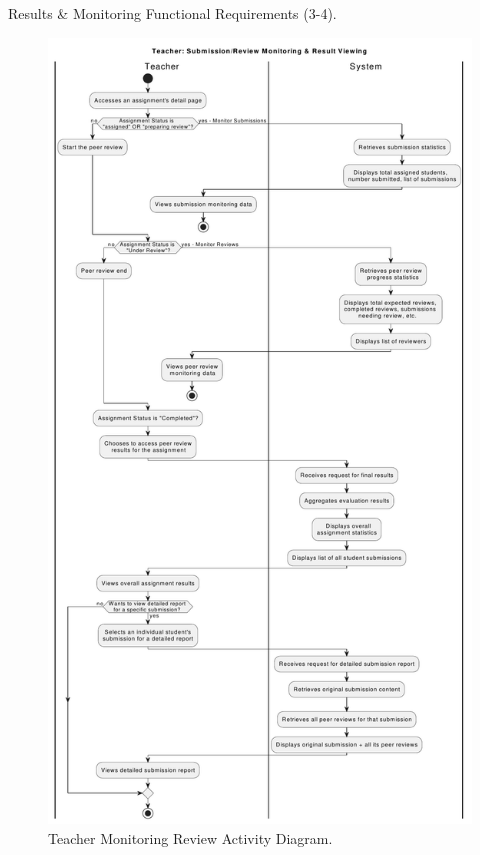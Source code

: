 \begin{table}[h]
    \centering
    \caption{Results \& Monitoring Functional Requirements (3-4).}
    \label{tab:ResultMonitoringFR3}
\end{table}

\clearpage

\begin{figure}[h]
    \centering
    \includegraphics[width=0.7\linewidth]{SRS/imgs/6_TeacherMonitoring.pdf}
    \caption{Teacher Monitoring Review Activity Diagram.}
    \label{fig:TeacherMonitoringAD}
\end{figure}

\clearpage

